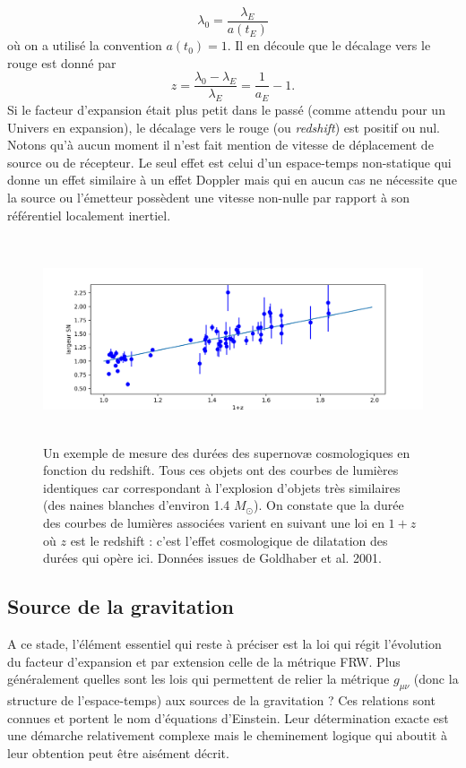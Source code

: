 \begin{equation}
\lambda_0=\frac{\lambda_E}{a(t_E)}
\end{equation}
où on a utilisé la convention $a(t_0)=1$. Il en découle que le décalage vers le rouge est donné par
\begin{equation}
z = \frac{\lambda_0-\lambda_E}{\lambda_E}=\frac{1}{a_E}-1.
\end{equation}
Si le facteur d'expansion était plus petit dans le passé (comme attendu pour un Univers en expansion), le décalage vers le rouge (ou \textit{redshift}) est positif ou nul. Notons qu'à aucun moment il n'est fait mention de vitesse de déplacement de source ou de récepteur. Le seul effet est celui d'un espace-temps non-statique qui donne un effet similaire à un effet Doppler mais qui en aucun cas ne nécessite que la source ou l'émetteur possèdent une vitesse non-nulle par rapport à son référentiel localement inertiel.

\begin{figure}[htbp]
	\centering
		\includegraphics[height=6cm]{figs/wSN.png}
	\caption[Durée des supernovæ en fonction du redshift]{Un exemple de mesure des durées des supernovæ cosmologiques en fonction du redshift. Tous ces objets ont des courbes de lumières identiques car correspondant à l'explosion d'objets très similaires (des naines blanches d'environ 1.4 $M_\odot$). On constate que la durée des courbes de lumières associées varient en suivant une loi en $1+z$ où $z$ est le redshift : c'est l'effet cosmologique de dilatation des durées qui opère ici. Données issues de Goldhaber et al. 2001.}
	\label{f:wSN}
\end{figure}

\subsection{Source de la gravitation}
A ce stade, l'élément essentiel qui reste à préciser est la loi qui régit l'évolution du facteur d'expansion et par extension celle de la métrique FRW. Plus généralement quelles sont les lois qui permettent de relier la métrique $g_{\mu\nu}$ (donc la structure de l'espace-temps) aux sources de la gravitation ? Ces relations sont connues et portent le nom d'équations d'Einstein. Leur détermination exacte est une démarche relativement complexe mais le cheminement logique qui aboutit à leur obtention peut être aisément décrit. 

